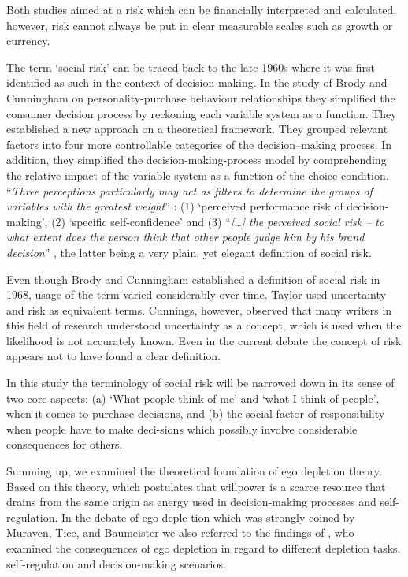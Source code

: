 Both studies aimed at a risk which can be financially interpreted and calculated, however, risk cannot always be put in clear measurable scales such as growth or currency.\par
The term ‘social risk’ can be traced back to the late 1960s where it was first identified as such in the context of decision-making. In the study of Brody and Cunningham \citep{brody1968personality} on personality-purchase behaviour relationships they simplified the consumer decision process by reckoning each variable system as a function. They established a new approach on a theoretical framework. They grouped relevant factors into four more controllable categories of the decision–making process.  In addition, they simplified the decision-making-process model by comprehending the relative impact of the variable system as a function of the choice condition. “\emph{Three perceptions particularly may act as filters to determine the groups of variables with the greatest weight}” \citep{brody1968personality}: (1) ‘perceived performance risk of decision-making’, (2) ‘specific self-confidence’ and (3) “\emph{[\ldots] the perceived social risk – to what extent does the person think that other people judge him by his brand decision}” \citep[p.~51]{brody1968personality}, the latter being a very plain, yet elegant definition of social risk.\par
Even though Brody and Cunningham established a definition of social risk in 1968, usage of the term varied considerably over time. Taylor \citep{taylor1974role} used uncertainty and risk as equivalent terms. Cunnings, however, observed that many writers in this field of research understood uncertainty as a concept, which is used when the likelihood is not accurately known. Even in the current debate the concept of risk appears not to have found a clear definition.\par
In this study the terminology of social risk will be narrowed down in its sense of two core aspects: (a) ‘What people think of me’ and ‘what I think of people’, when it comes to purchase decisions, and (b) the social factor of responsibility when people have to make deci-sions which possibly involve considerable consequences for others.\par
Summing up, we examined the theoretical foundation of ego depletion theory. Based on this theory, which postulates that willpower is a scarce resource that drains from the same origin as energy used in decision-making processes and self-regulation. In the debate of ego deple-tion which was strongly coined by Muraven, Tice, and Baumeister we also referred to the findings of \citep{vohs2000self,pocheptsova2009deciding,bruyneel2009felt}, who examined the consequences of ego depletion in regard to different depletion tasks, self-regulation and decision-making scenarios.\par
